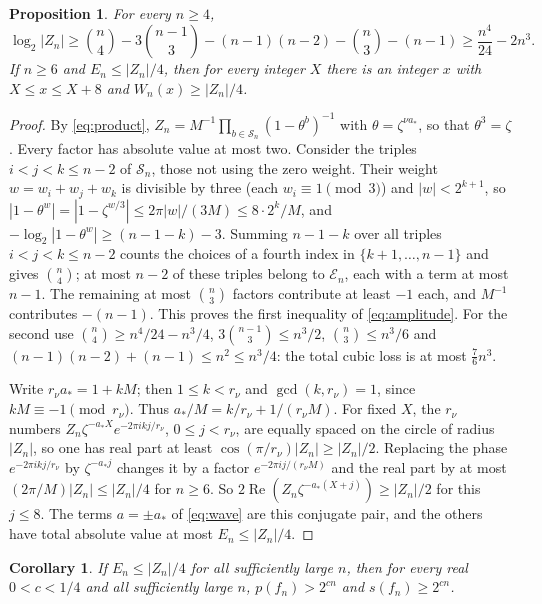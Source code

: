 \documentclass[11pt,a4paper]{article}
\newtheorem{proposition}[theorem]{Proposition}
\newtheorem{corollary}[theorem]{Corollary}
\theoremstyle{definition}
\begin{document}
\begin{proposition}\label{prop:amplitude}
For every $n\ge4$,
\begin{equation}\label{eq:amplitude}
 \log_2|Z_n|\ge\binom n4-3\binom{n-1}3-(n-1)(n-2)-\binom n3-(n-1)
 \ge\frac{n^4}{24}-2n^3 .
\end{equation}
If $n\ge6$ and $E_n\le|Z_n|/4$, then for every integer $X$ there is an integer
$x$ with $X\le x\le X+8$ and $W_n(x)\ge|Z_n|/4$.
\end{proposition}

\begin{proof}
By \eqref{eq:product}, $Z_n=M^{-1}\prod_{b\in\mathcal S_n}(1-\theta^b)^{-1}$ with
$\theta=\zeta^{\nu a_*}$, so that $\theta^3=\zeta$. Every factor has absolute
value at most two. Consider the triples $i<j<k\le n-2$ of $\mathcal S_n$, those
not using the zero weight. Their weight $w=w_i+w_j+w_k$ is divisible by three
(each $w_i\equiv1\pmod3$) and $|w|<2^{k+1}$, so
$|1-\theta^w|=|1-\zeta^{w/3}|\le2\pi|w|/(3M)\le8\cdot2^k/M$, and
$-\log_2|1-\theta^w|\ge(n-1-k)-3$. Summing $n-1-k$ over all triples
$i<j<k\le n-2$ counts the choices of a fourth index in $\{k+1,\dots,n-1\}$ and
gives $\binom n4$; at most $n-2$ of these triples belong to $\mathcal E_n$, each
with a term at most $n-1$. The remaining at most $\binom n3$ factors contribute
at least $-1$ each, and $M^{-1}$ contributes $-(n-1)$. This proves the first
inequality of \eqref{eq:amplitude}. For the second use $\binom n4\ge
n^4/24-n^3/4$, $3\binom{n-1}3\le n^3/2$, $\binom n3\le n^3/6$ and
$(n-1)(n-2)+(n-1)\le n^2\le n^3/4$: the total cubic loss is at most
$\tfrac76n^3$.

Write $r_\nu a_*=1+kM$; then $1\le k<r_\nu$ and $\gcd(k,r_\nu)=1$, since
$kM\equiv-1\pmod{r_\nu}$. Thus $a_*/M=k/r_\nu+1/(r_\nu M)$. For fixed $X$, the
$r_\nu$ numbers $Z_n\zeta^{-a_*X}e^{-2\pi ikj/r_\nu}$, $0\le j<r_\nu$, are
equally spaced on the circle of radius $|Z_n|$, so one has real part at least
$\cos(\pi/r_\nu)|Z_n|\ge|Z_n|/2$. Replacing the phase $e^{-2\pi ikj/r_\nu}$ by
$\zeta^{-a_*j}$ changes it by a factor $e^{-2\pi ij/(r_\nu M)}$ and the real
part by at most $(2\pi/M)|Z_n|\le|Z_n|/4$ for $n\ge6$. So
$2\operatorname{Re}(Z_n\zeta^{-a_*(X+j)})\ge|Z_n|/2$ for this $j\le8$. The terms
$a=\pm a_*$ of \eqref{eq:wave} are this conjugate pair, and the others have
total absolute value at most $E_n\le|Z_n|/4$.
\end{proof}

\begin{corollary}\label{cor:conditional}
If $E_n\le|Z_n|/4$ for all sufficiently large $n$, then for every real
$0<c<1/4$ and all sufficiently large $n$, $p(f_n)>2^{cn}$ and $s(f_n)\ge2^{cn}$.
\end{corollary}
\end{document}
